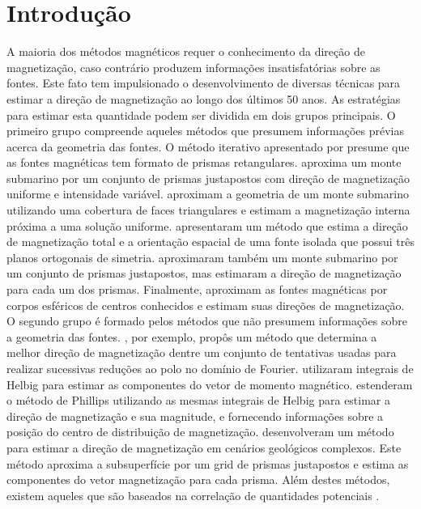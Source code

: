 \chapter{Introdução}
\label{chap:introducao}

A maioria dos métodos magnéticos requer o conhecimento da direção de magnetização, caso contrário produzem 
informações insatisfatórias sobre as fontes. Este fato tem impulsionado o desenvolvimento de diversas técnicas 
para estimar a direção de magnetização ao longo dos últimos 50 anos. As estratégias para estimar esta quantidade 
podem ser dividida em dois grupos principais. O primeiro grupo compreende aqueles métodos que presumem informações 
prévias acerca da geometria das fontes. O método iterativo apresentado por \cite{bhattacharyya1966} presume 
que as fontes magnéticas tem formato de prismas retangulares. \cite{emilia_massey_1974} aproxima um monte 
submarino por um conjunto de prismas justapostos com direção de magnetização uniforme e intensidade variável. 
\cite{parker_etal_1987} aproximam a geometria de um monte submarino utilizando uma cobertura de faces 
triangulares e estimam a magnetização interna próxima a uma solução uniforme. \cite{parker_etal_1987} apresentaram 
um método que estima a direção de magnetização total e a orientação espacial de uma fonte isolada que possui 
três planos ortogonais de simetria. \cite{kubota2005} aproximaram também um monte submarino por um conjunto 
de prismas justapostos, mas estimaram a direção de magnetização para cada um dos prismas. 
Finalmente, \cite{oliveirajr_etal_2015} aproximam as fontes magnéticas por corpos esféricos de centros conhecidos 
e estimam suas direções de magnetização. O segundo grupo é formado pelos métodos que não presumem informações 
sobre a geometria das fontes. \cite{fedi_etal_1994}, por exemplo, propôs um método que determina a melhor 
direção de magnetização dentre um conjunto de tentativas usadas para realizar sucessivas reduções ao polo no 
domínio de Fourier. \cite{phillips2005} utilizaram integrais de Helbig para estimar as componentes do vetor 
de momento magnético. \cite{tontini_pedersen_2008} estenderam o método de Phillips utilizando as mesmas 
integrais de Helbig para estimar a direção de magnetização e sua magnitude, e fornecendo informações sobre a 
posição do centro de distribuição de magnetização. \cite{lelievre_oldenburg_2009} desenvolveram um método para 
estimar a direção de magnetização em cenários geológicos complexos. Este método aproxima a subsuperfície por um 
grid de prismas justapostos e estima as componentes do vetor magnetização para cada prisma. 
Além destes métodos, existem aqueles que são baseados na correlação de quantidades potenciais 
\citep[e.g.,][]{dannemiller_li_2006,gerovska_etal_2009,liu_etal_2015,zhang_etal_2018}. 

